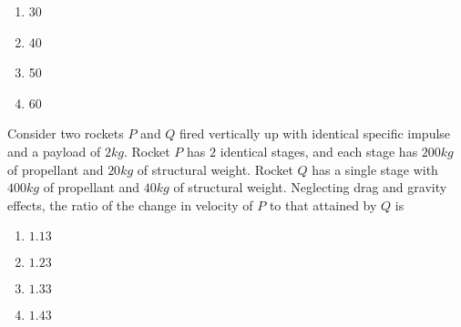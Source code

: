 	\begin{enumerate}
	\item 30 \item 40 \item 50 \item 60
	\end{enumerate}
\item Consider two rockets $P$ and $Q$ fired vertically up with identical specific impulse and a payload of $2 kg$. Rocket $P$ has $2$ identical stages, and each stage has $200 kg$ of propellant and $20 kg$ of structural weight. Rocket $Q$ has a single stage with $400 kg$ of propellant and $40 kg$ of structural weight. Neglecting drag and gravity effects, the ratio of the change in velocity of $P$ to that attained by $Q$ is 
	\begin{enumerate}
\item $1.13$ \item $1.23$ \item $1.33$ \item $1.43$
	\end{enumerate}

